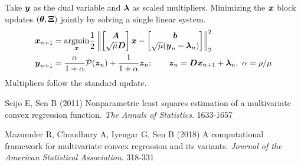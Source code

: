 \documentclass{article}
\begin{document}
Take $\boldsymbol{y}$ as the dual variable and $\boldsymbol{\lambda}$ as scaled multipliers.
Minimizing the $\boldsymbol{x}$ block updates $(\boldsymbol{\theta},\boldsymbol{\Xi})$ jointly by solving a single linear system.
\begin{align*}
    \boldsymbol{x}_{n+1}
    &=
    \underset{\boldsymbol{x}}{\mathop{\rm argmin}\nolimits} \frac{1}{2} \left\|
        \begin{bmatrix}
        \boldsymbol{A} \\
        \sqrt{\mu} \boldsymbol{D}
        \end{bmatrix} \boldsymbol{x}
        -
        \begin{bmatrix}
        \boldsymbol{b} \\
        \sqrt{\mu} (\boldsymbol{y}_{n} - \boldsymbol{\lambda}_{n})
        \end{bmatrix}
    \right\|_{2}^{2} \\
    \boldsymbol{y}_{n+1}
    &= \frac{\alpha}{1+\alpha} \mathcal{P}(\boldsymbol{z}_{n}) + \frac{1}{1+\alpha} \boldsymbol{z}_{n};
    \qquad \boldsymbol{z}_{n} = \boldsymbol{D} \boldsymbol{x}_{n+1} + \boldsymbol{\lambda}_{n},~\alpha = \rho / \mu
    \end{align*}
Multipliers follow the standard update.

\begin{thebibliography}{99}
    Seijo E, Sen B (2011) {Nonparametric least squares estimation of a multivariate convex regression function}. {\it The Annals of Statistics}. 1633-1657

    Mazumder R, Choudhury A, Iyengar G, Sen B (2018) {A computational framework for multivariate convex regression and its variants}. {\it Journal of the American Statistical Association}. 318-331
\end{thebibliography}
\end{document}

